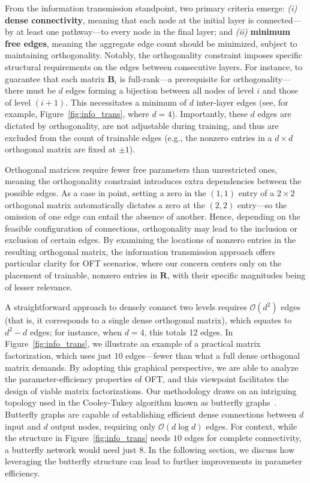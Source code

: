 From the information transmission standpoint, two primary criteria emerge: \emph{(i)} \textbf{dense connectivity}, meaning that each node at the initial layer is connected—by at least one pathway—to every node in the final layer; and \emph{(ii)} \textbf{minimum free edges}, meaning the aggregate edge count should be minimized, subject to maintaining orthogonality. Notably, the orthogonality constraint imposes specific structural requirements on the edges between consecutive layers. For instance, to guarantee that each matrix $\bm{B}_i$ is full-rank—a prerequisite for orthogonality—there must be $d$ edges forming a bijection between all nodes of level $i$ and those of level $(i+1)$. This necessitates a minimum of $d$ inter-layer edges (see, for example, Figure~\ref{fig:info_trans}, where $d=4$). Importantly, these $d$ edges are dictated by orthogonality, are not adjustable during training, and thus are excluded from the count of trainable edges (e.g., the nonzero entries in a $d\times d$ orthogonal matrix are fixed at $\pm 1$). 

Orthogonal matrices require fewer free parameters than unrestricted ones, meaning the orthogonality constraint introduces extra dependencies between the possible edges. As a case in point, setting a zero in the $(1,1)$ entry of a $2\times2$ orthogonal matrix automatically dictates a zero at the $(2,2)$ entry—so the omission of one edge can entail the absence of another. Hence, depending on the feasible configuration of connections, orthogonality may lead to the inclusion or exclusion of certain edges. By examining the locations of nonzero entries in the resulting orthogonal matrix, the information transmission approach offers particular clarity for OFT scenarios, where our concern centers only on the placement of trainable, nonzero entries in $\bm{R}$, with their specific magnitudes being of lesser relevance.

A straightforward approach to densely connect two levels requires $\mathcal{O}(d^2)$ edges (that is, it corresponds to a single dense orthogonal matrix), which equates to $d^2 - d$ edges; for instance, when $d=4$, this totals 12 edges. In Figure~\ref{fig:info_trans}, we illustrate an example of a practical matrix factorization, which uses just $10$ edges—fewer than what a full dense orthogonal matrix demands. By adopting this graphical perspective, we are able to analyze the parameter-efficiency properties of OFT, and this viewpoint facilitates the design of viable matrix factorizations. Our methodology draws on an intriguing topology used in the Cooley-Tukey algorithm known as butterfly graphs~\cite{cooley1965algorithm}. Butterfly graphs are capable of establishing efficient dense connections between $d$ input and $d$ output nodes, requiring only $\mathcal{O}(d\log d)$ edges. For context, while the structure in Figure~\ref{fig:info_trans} needs $10$ edges for complete connectivity, a butterfly network would need just $8$. In the following section, we discuss how leveraging the butterfly structure can lead to further improvements in parameter efficiency.

